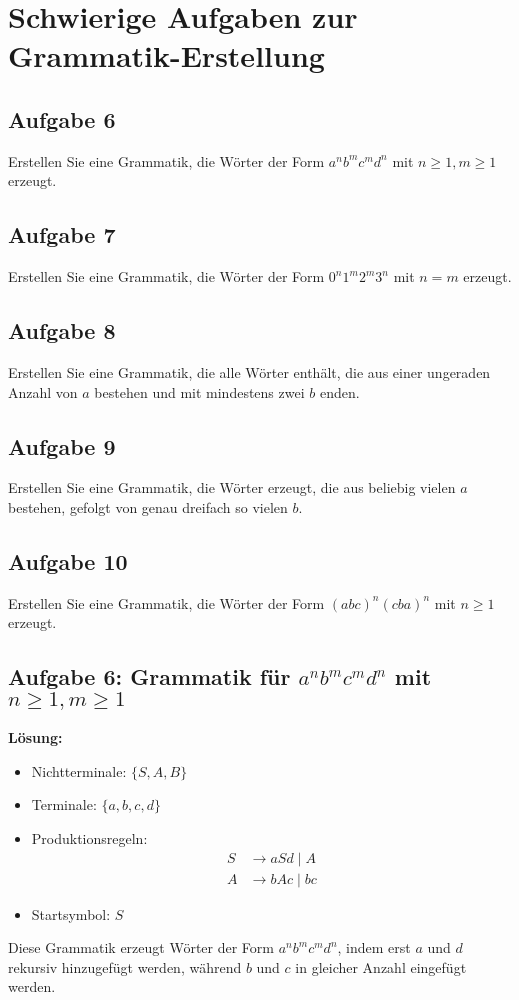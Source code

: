 \documentclass[a4paper,12pt]{article}
\begin{document}
	\newpage
	\section*{Schwierige Aufgaben zur Grammatik-Erstellung}
	
	\subsection*{Aufgabe 6}
	Erstellen Sie eine Grammatik, die Wörter der Form $a^n b^m c^m d^n$ mit $n \geq 1, m \geq 1$ erzeugt.
	
	\subsection*{Aufgabe 7}
	Erstellen Sie eine Grammatik, die Wörter der Form $0^n 1^m 2^m 3^n$ mit $n = m$ erzeugt.
	
	\subsection*{Aufgabe 8}
	Erstellen Sie eine Grammatik, die alle Wörter enthält, die aus einer ungeraden Anzahl von $a$ bestehen und mit mindestens zwei $b$ enden.
	
	\subsection*{Aufgabe 9}
	Erstellen Sie eine Grammatik, die Wörter erzeugt, die aus beliebig vielen $a$ bestehen, gefolgt von genau dreifach so vielen $b$.
	
	\subsection*{Aufgabe 10}
	Erstellen Sie eine Grammatik, die Wörter der Form $(abc)^n (cba)^n$ mit $n \geq 1$ erzeugt.
	
	\newpage
	\subsection*{Aufgabe 6: Grammatik für $a^n b^m c^m d^n$ mit $n \geq 1, m \geq 1$}
	\textbf{Lösung:}
	\begin{itemize}
		\item Nichtterminale: $\{S, A, B\}$
		\item Terminale: $\{a, b, c, d\}$
		\item Produktionsregeln:
		\begin{align*}
			S &\rightarrow a S d \mid A \\
			A &\rightarrow b A c \mid bc
		\end{align*}
		\item Startsymbol: $S$
	\end{itemize}
	Diese Grammatik erzeugt Wörter der Form $a^n b^m c^m d^n$, indem erst $a$ und $d$ rekursiv hinzugefügt werden, während $b$ und $c$ in gleicher Anzahl eingefügt werden.
	
\end{document}
